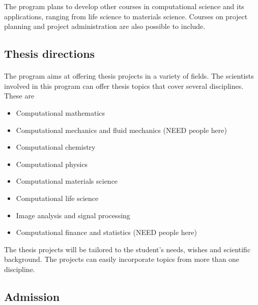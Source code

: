 \documentclass[%
oneside,                 %
final,                   %
10pt]{article}
\begin{document}
\noindent
The program plans to develop other courses in computational science and its applications, ranging from life science to materials science.
Courses on project planning and project administration are also possible to include.





\subsection*{Thesis directions}

\paragraph{}
The program aims at offering thesis projects in a variety of fields. The scientists involved in this program can offer thesis 
topics that cover several disciplines. These are

\begin{itemize}
\item Computational mathematics

\item Computational mechanics and fluid mechanics  (NEED people here)

\item Computational chemistry

\item Computational physics

\item Computational materials science

\item Computational life science

\item Image analysis and signal processing

\item Computational finance and statistics   (NEED people here)
\end{itemize}

\noindent
The thesis projects will be tailored to the student's needs, wishes and scientific background. The projects can easily incorporate topics from more than one discipline.







\subsection*{Admission}
\end{document}
